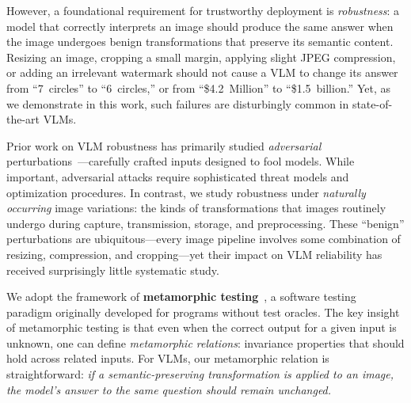 \documentclass[10pt,twocolumn,letterpaper]{article}
\begin{document}
However, a foundational requirement for trustworthy deployment is \emph{robustness}: a model that correctly interprets an image should produce the same answer when the image undergoes benign transformations that preserve its semantic content. Resizing an image, cropping a small margin, applying slight JPEG compression, or adding an irrelevant watermark should not cause a VLM to change its answer from ``7~circles'' to ``6~circles,'' or from ``\$4.2~Million'' to ``\$1.5~billion.'' Yet, as we demonstrate in this work, such failures are disturbingly common in state-of-the-art VLMs.

Prior work on VLM robustness has primarily studied \emph{adversarial} perturbations~\cite{goodfellow2015explaining,dong2023robust,carlini2024aligned}---carefully crafted inputs designed to fool models. While important, adversarial attacks require sophisticated threat models and optimization procedures. In contrast, we study robustness under \emph{naturally occurring} image variations: the kinds of transformations that images routinely undergo during capture, transmission, storage, and preprocessing. These ``benign'' perturbations are ubiquitous---every image pipeline involves some combination of resizing, compression, and cropping---yet their impact on VLM reliability has received surprisingly little systematic study.

We adopt the framework of \textbf{metamorphic testing}~\cite{chen2018metamorphic,segura2016survey}, a software testing paradigm originally developed for programs without test oracles. The key insight of metamorphic testing is that even when the correct output for a given input is unknown, one can define \emph{metamorphic relations}: invariance properties that should hold across related inputs. For VLMs, our metamorphic relation is straightforward: \emph{if a semantic-preserving transformation is applied to an image, the model's answer to the same question should remain unchanged.}
\end{document}
